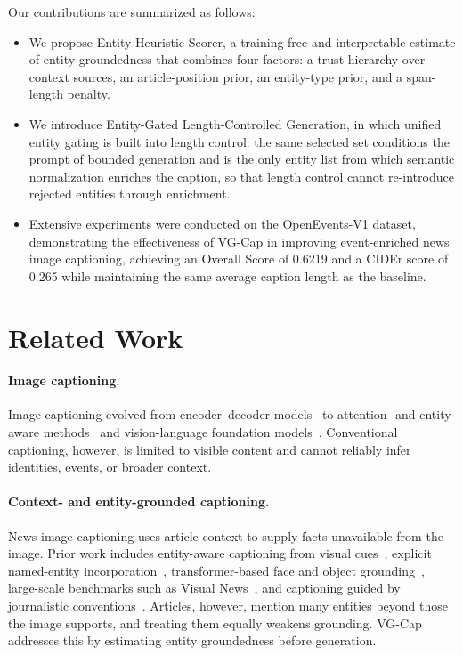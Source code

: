 \documentclass[runningheads]{llncs}
\DeclareRobustCommand{\aciids}[1]{{\color{olive}#1}}
\DeclareRobustCommand{\revise}[1]{{\color{blue}#1}}
\DeclareRobustCommand{\aciids}[1]{#1}
\DeclareRobustCommand{\revise}[1]{#1}
\begin{document}
Our contributions are summarized as follows:
\begin{itemize}
  \item \aciids{We propose Entity Heuristic Scorer, a training-free and interpretable estimate of entity groundedness that combines four factors: a trust hierarchy over context sources, an article-position prior, an entity-type prior, and a span-length penalty.}
  \item \aciids{We introduce Entity-Gated Length-Controlled Generation, in which unified entity gating is built into length control: the same selected set conditions the prompt of bounded generation and is the only entity list from which semantic normalization enriches the caption, so that length control cannot re-introduce rejected entities through enrichment.}
  \item \aciids{Extensive experiments were conducted on the OpenEvents-V1 dataset, demonstrating the effectiveness of VG-Cap in improving event-enriched news image captioning, achieving an Overall Score of 0.6219 and a CIDEr score of 0.265 while maintaining the same average caption length as the baseline.}
\end{itemize}

\section{Related Work}
\label{sec:related}

\paragraph{\textbf{Image captioning.}}
Image captioning evolved from encoder--decoder models~\cite{vinyals2015show} to attention- and entity-aware methods~\cite{you2016image,lu2018entity} and vision-language foundation models~\cite{chen2024internvl}. Conventional captioning, however, is limited to visible content and cannot reliably infer identities, events, or broader context.

\paragraph{\textbf{Context- and entity-grounded captioning.}}
News image captioning uses article context to supply facts unavailable from the image. Prior work includes entity-aware captioning from visual cues~\cite{biten2019good}, explicit named-entity incorporation~\cite{lu2018entity}, transformer-based face and object grounding~\cite{tran2020transform}, \revise{large-scale benchmarks such as Visual News~\cite{liu2021visualnews}, and captioning guided by journalistic conventions~\cite{yang2021journalistic}}. Articles, however, mention many entities beyond those the image supports, and treating them equally weakens grounding. VG-Cap addresses this by estimating entity groundedness before generation.
\end{document}
